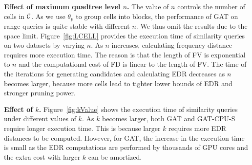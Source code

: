 \documentclass[10pt,conference,letterpaper]{IEEEtran}
\newcommand{\frname}{GAT\xspace }
\newcommand{\allcell}{{\cal C}\xspace}
\newcommand{\treeindex}{{{\cal I}_Q}\xspace}
\begin{document}
\vspace{0.1cm}\textbf{Effect of maximum quadtree level $n$.}
The value of $n$ controls the number of cells in $\allcell$. As we use $\theta_p$ to group cells into blocks, the performance of \frname on range queries is quite stable with different $n$. We thus omit the results due to the space limit.
Figure~\ref{fig:LCELL} provides the execution time of similarity queries on two datasets by varying $n$. As $n$ increases, calculating frequency distance requires more execution time. The reason is that the length of FV is exponential to $n$ and the computational cost of FD is linear to the length of FV. The time of the iterations for generating candidates and calculating EDR decreases as $n$ becomes larger, because more cells lead to tighter lower bounds of EDR and stronger pruning power.





\vspace{0.1cm}\textbf{Effect of $k$.}
Figure~\ref{fig:kValue} shows the execution time of similarity queries under different values of $k$. As $k$ becomes larger, both \frname and \frname-CPU-S require longer execution time. This is because larger $k$ requires more EDR distances to be computed.
However, for \frname, the increase in the execution time is small as the EDR computations are performed by thousands of GPU cores and the extra cost with larger $k$ can be amortized.
\end{document}
